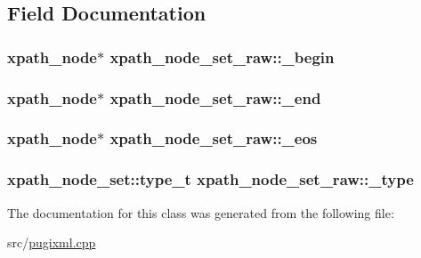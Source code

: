 \subsection{Field Documentation}
\hypertarget{classxpath__node__set__raw_a8e6071473610e8340b07a64767ef68c0}{
\subsubsection[{\_\-begin}]{\setlength{\rightskip}{0pt plus 5cm}xpath\_\-node$\ast$ {\bf xpath\_\-node\_\-set\_\-raw::\_\-begin}}}
\label{classxpath__node__set__raw_a8e6071473610e8340b07a64767ef68c0}
\hypertarget{classxpath__node__set__raw_af8435774146a65edee6cf320dbb8930f}{
\subsubsection[{\_\-end}]{\setlength{\rightskip}{0pt plus 5cm}xpath\_\-node$\ast$ {\bf xpath\_\-node\_\-set\_\-raw::\_\-end}}}
\label{classxpath__node__set__raw_af8435774146a65edee6cf320dbb8930f}
\hypertarget{classxpath__node__set__raw_a886a925457f162fe38483da1d57b9b56}{
\subsubsection[{\_\-eos}]{\setlength{\rightskip}{0pt plus 5cm}xpath\_\-node$\ast$ {\bf xpath\_\-node\_\-set\_\-raw::\_\-eos}}}
\label{classxpath__node__set__raw_a886a925457f162fe38483da1d57b9b56}
\hypertarget{classxpath__node__set__raw_a00a164066aff1d6075631b2532ed9713}{
\subsubsection[{\_\-type}]{\setlength{\rightskip}{0pt plus 5cm}xpath\_\-node\_\-set::type\_\-t {\bf xpath\_\-node\_\-set\_\-raw::\_\-type}}}
\label{classxpath__node__set__raw_a00a164066aff1d6075631b2532ed9713}


The documentation for this class was generated from the following file:\begin{DoxyCompactItemize}
\item 
src/\hyperlink{pugixml_8cpp}{pugixml.cpp}\end{DoxyCompactItemize}
